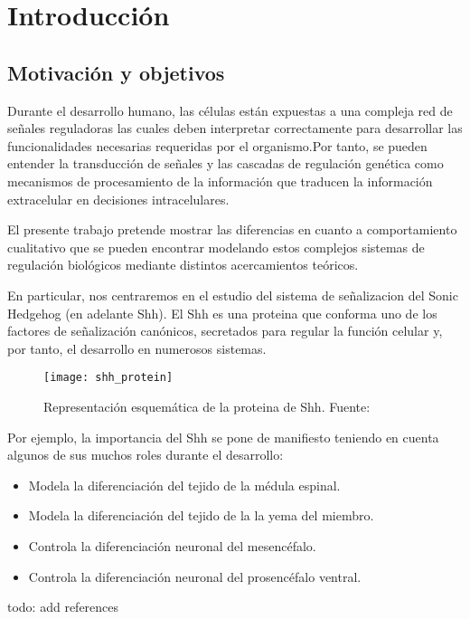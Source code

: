 \chapter{Introducción}

\section{ Motivación y objetivos}
\cite{multiple,cambon1,schaffer,saha,bintu2005transcriptional,parker2011cis,meijer2012numerical}

Durante el desarrollo humano, las células están expuestas a una compleja red de señales reguladoras las cuales deben interpretar correctamente para desarrollar las funcionalidades necesarias requeridas por el organismo.Por tanto, se pueden entender la transducción de señales y las cascadas de regulación genética como mecanismos de procesamiento de la información que traducen la información extracelular en decisiones intracelulares.

El presente trabajo pretende mostrar las diferencias en cuanto a comportamiento cualitativo que se pueden encontrar modelando estos complejos sistemas de regulación biológicos mediante distintos acercamientos teóricos. 

En particular, nos centraremos en el estudio del sistema de señalizacion del Sonic Hedgehog (en adelante Shh). 
El Shh es una proteina que conforma uno de los factores de señalización  canónicos, secretados
para regular la función celular y, por tanto, el desarrollo en numerosos sistemas.
\begin{figure}[h]
	\texttt{[image: shh\_protein]}
	\centering
	\caption{Representación esquemática de la proteina de Shh. Fuente: \cite{wiki:foto_shh}}
\end{figure}


Por ejemplo, la importancia del Shh se pone de manifiesto teniendo en cuenta algunos de sus muchos roles durante el desarrollo: 
\begin{itemize}
	\item Modela la diferenciación del tejido de la médula espinal.
	\item Modela la diferenciación del tejido de la la yema del miembro.
	\item Controla la diferenciación neuronal del mesencéfalo. 
	\item Controla la diferenciación neuronal del prosencéfalo ventral.
\end{itemize}
\small{todo: add references}

